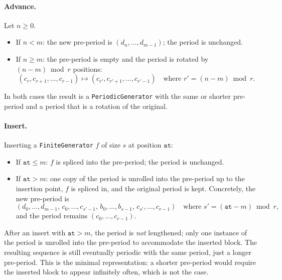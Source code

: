\paragraph{Advance.}
Let $n \geq 0$.
\begin{itemize}
  \item If $n < m$: the new pre-period is $(d_n, \ldots, d_{m-1})$; the
        period is unchanged.
  \item If $n \geq m$: the pre-period is empty and the period is rotated by
        $(n - m) \bmod r$ positions:
        \[
          (c_r, c_{r+1}, \ldots, c_{r-1}) \mapsto
          (c_{r'}, c_{r'+1}, \ldots, c_{r'-1})
          \quad\text{where } r' = (n - m) \bmod r.
        \]
\end{itemize}
In both cases the result is a \texttt{PeriodicGenerator} with the same or
shorter pre-period and a period that is a rotation of the original.

\paragraph{Insert.}
Inserting a \texttt{FiniteGenerator} $f$ of size $s$ at position
$\mathtt{at}$:
\begin{itemize}
  \item If $\mathtt{at} \leq m$: $f$ is spliced into the pre-period;
        the period is unchanged.
  \item If $\mathtt{at} > m$: one copy of the period is unrolled into
        the pre-period up to the insertion point, $f$ is spliced in, and
        the original period is kept.  Concretely, the new pre-period is
        \[
          (d_0, \ldots, d_{m-1},\,
           c_0, \ldots, c_{s'-1},\,
           b_0, \ldots, b_{s-1},\,
           c_{s'}, \ldots, c_{r-1})
          \quad\text{where } s' = (\mathtt{at} - m) \bmod r,
        \]
        and the period remains $(c_0, \ldots, c_{r-1})$.
\end{itemize}

\begin{remark}
  After an insert with $\mathtt{at} > m$, the period is
  \emph{not} lengthened; only one instance of the period is unrolled into the
  pre-period to accommodate the inserted block.  The resulting sequence is
  still eventually periodic with the same period, just a longer pre-period.
  This is the minimal representation: a shorter pre-period would require
  the inserted block to appear infinitely often, which is not the case.
\end{remark}


